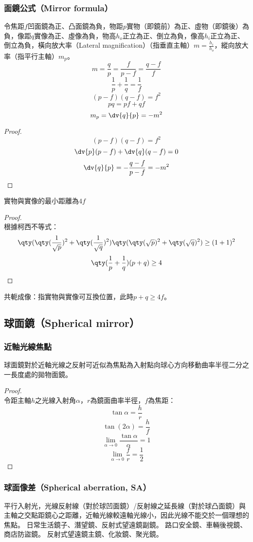 \documentclass[a4paper,12pt]{report}
\begin{document}
\subsubsection{面鏡公式（Mirror formula）}
令焦距$f$凹面鏡為正、凸面鏡為負，物距$p$實物（即鏡前）為正、虛物（即鏡後）為負，像距$q$實像為正、虛像為負，物高$h_o$正立為正、倒立為負，像高$h_i$正立為正、倒立為負，橫向放大率（Lateral magnification）（指垂直主軸）$m=\frac{h_i}{h_o}$，縱向放大率（指平行主軸）$m_p$。
\[m=\frac{q}{p}=\frac{f}{p-f}=\frac{q-f}{f}\]
\[\frac{1}{p}+\frac{1}{q}=\frac{1}{f}\]
\[(p-f)(q-f)=f^2\]
\[pq=pf+qf\]
\[m_p=\dv{q}{p}=-m^2\]
\begin{proof}
\[(p-f)(q-f)=f^2\]
\[\dv{p}(p-f)+\dv{q}(q-f)=0\]
\[\dv{q}{p}=-\frac{q-f}{p-f}=-m^2\]
\end{proof}
實物與實像的最小距離為$4f$
\begin{proof}\mbox{}\\
根據柯西不等式：
\[\qty(\qty(\frac{1}{\sqrt{p}})^2+\qty(\frac{1}{\sqrt{q}})^2)\qty(\qty(\sqrt{p})^2+\qty(\sqrt{q})^2)\geq (1+1)^2\]
\[\qty(\frac{1}{p}+\frac{1}{q})(p+q)\geq 4\]
\end{proof}
共軛成像：指實物與實像可互換位置，此時$p+q\geq 4f$。
\subsection{球面鏡（Spherical mirror）}
\subsubsection{近軸光線焦點}
球面鏡對於近軸光線之反射可近似為焦點為入射點向球心方向移動曲率半徑二分之一長度處的拋物面鏡。

\begin{proof}\mbox{}\\
令距主軸$h$之光線入射角$\alpha$，$r$為鏡面曲率半徑，$f$為焦距：
\[\tan\alpha=\frac{h}{r}\]
\[\tan(2\alpha)=\frac{h}{f}\]
\[\lim_{\alpha\to 0}\frac{\tan\alpha}{\alpha}=1\]
\[\lim_{\alpha\to 0}\frac{f}{r}=\frac{1}{2}\]
\end{proof}
\subsubsection{球面像差（Spherical aberration, SA）}
平行入射光，光線反射線（對於球凹面鏡）/反射線之延長線（對於球凸面鏡）與主軸之交點距鏡心之距離，近軸光線較遠軸光線小，因此光線不能交於一個理想的焦點。
日常生活鏡子、潛望鏡、反射式望遠鏡副鏡。
路口安全鏡、車輛後視鏡、商店防盜鏡。
反射式望遠鏡主鏡、化妝鏡、聚光鏡。
\end{document}
